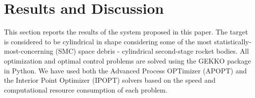 \chapter{Results and Discussion}
\label{sec:results}
This section reports the results of the system proposed in this paper.
The target is considered to be cylindrical in shape considering some of the most statistically-most-concerning (SMC) space debris \cite{mcknight2021identifying} - cylindrical second-stage rocket bodies.
All optimization and optimal control problems are solved using the GEKKO package \cite{beal2018gekko} in Python.
We have used both the Advanced Process OPTimizer (APOPT) \cite{hedengren2014nonlinear} and the Interior Point Optimizer (IPOPT) \cite{wachter2006on} solvers based on the speed and computational resource consumption of each problem.

